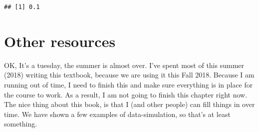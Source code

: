 \documentclass[
]{book}
\newenvironment{Shaded}{\begin{snugshade}}{\end{snugshade}}
\newcommand{\CommentTok}[1]{\textcolor[rgb]{0.56,0.35,0.01}{\textit{#1}}}
\newcommand{\ControlFlowTok}[1]{\textcolor[rgb]{0.13,0.29,0.53}{\textbf{#1}}}
\newcommand{\DataTypeTok}[1]{\textcolor[rgb]{0.13,0.29,0.53}{#1}}
\newcommand{\DecValTok}[1]{\textcolor[rgb]{0.00,0.00,0.81}{#1}}
\newcommand{\FloatTok}[1]{\textcolor[rgb]{0.00,0.00,0.81}{#1}}
\newcommand{\KeywordTok}[1]{\textcolor[rgb]{0.13,0.29,0.53}{\textbf{#1}}}
\newcommand{\NormalTok}[1]{#1}
\newcommand{\OperatorTok}[1]{\textcolor[rgb]{0.81,0.36,0.00}{\textbf{#1}}}
\newcommand{\StringTok}[1]{\textcolor[rgb]{0.31,0.60,0.02}{#1}}
\begin{document}
\begin{Shaded}
\end{Shaded}

\begin{verbatim}
## [1] 0.1
\end{verbatim}

\hypertarget{other-resources}{%
\section{Other resources}\label{other-resources}}

OK, It's a tuesday, the summer is almost over. I've spent most of this summer (2018) writing this textbook, because we are using it this Fall 2018. Because I am running out of time, I need to finish this and make sure everything is in place for the course to work. As a result, I am not going to finish this chapter right now. The nice thing about this book, is that I (and other people) can fill things in over time. We have shown a few examples of data-simulation, so that's at least something.
\end{document}
